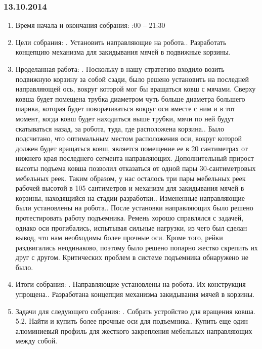 \documentclass[12pt]{article}
\begin{document}
	      \subsubsection{13.10.2014}
	      \begin{enumerate}
	      	\item Время начала и окончания собрания:
	      	:00 – 21:30
	      	\item Цели собрания:
	      	.	Установить направляющие на робота..	Разработать концепцию механизма для закидывания мячей в подвижные корзины.
	      	\item Проделанная работа:
	      	.	Поскольку в нашу стратегию входило возить подвижную корзину за собой сзади, было решено установить на последней направляющей ось, вокруг которой мог бы вращаться ковш с мячами. Сверху ковша будет помещена трубка диаметром чуть больше диаметра большего шарика, которая будет поворачиваться вокруг оси вместе с ним и в тот момент, когда ковш будет находиться выше трубки, мячи по ней будут скатываться назад, за робота, туда, где расположена корзина..	Было подсчитано, что оптимальным местом расположения оси, вокруг которой должен будет вращаться ковш, является помещение ее в 20 сантиметрах от нижнего края последнего сегмента направляющих. Дополнительный прирост высоты подъема ковша позволил отказаться от одной пары 30-сантиметровых мебельных реек. Таким образом, у нас осталось три пары мебельных реек рабочей высотой в 105 сантиметров и механизм для закидывания мячей в корзины, находящийся на стадии разработки..	Измененные направляющие были установлены на робота..	После установки направляющих было решено протестировать работу подъемника. Ремень хорошо справлялся с задачей, однако оси прогибались, испытывая сильные нагрузки, из чего был сделан вывод, что нам необходимы более прочные оси. Кроме того, рейки раздвигались неодинаково, поэтому было решено попарно жестко скрепить  их друг с другом. Критических проблем в системе подъемника обнаружено не было.
	      	
	      	\item Итоги собрания:
	      	.	Направляющие установлены на робота. Их конструкция упрощена..	Разработана концепция механизма закидывания мячей в корзины.
	      	
	      	\item Задачи для следующего собрания:
	      	.	Собрать устройство для вращения ковша.
	      	5.2.	Найти и купить более прочные оси для подъемника..	Купить еще один алюминиевый профиль для жесткого закрепления мебельных направляющих между собой.
	      	
	      \end{enumerate}
	      \newpage
\end{document}

